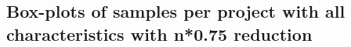 \begin{appendices}
\section{Box-plots of samples per project with all characteristics with n*0.75 reduction}
\label{ap:full_75}
\begin{figure}[h]
    \centering
    \qquad
\end{figure}


\end{appendices}
